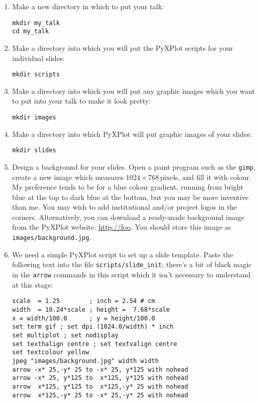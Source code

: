 \begin{enumerate}
\item Make a new directory in which to put your talk:
\begin{verbatim}
mkdir my_talk
cd my_talk
\end{verbatim}
\item Make a directory into which you will put the PyXPlot scripts for your
individual slides:
\begin{verbatim}
mkdir scripts
\end{verbatim}
\item Make a directory into which you will put any graphic images which you
want to put into your talk to make it look pretty:
\begin{verbatim}
mkdir images
\end{verbatim}
\item Make a directory into which PyXPlot will put graphic images of your
slides:
\begin{verbatim}
mkdir slides
\end{verbatim}
\item Design a background for your slides. Open a paint program such as the
{\tt gimp}, create a new image which measures $1024\times768$\,pixels, and fill
it with colour. My preference tends to be for a blue colour gradient, running
from bright blue at the top to dark blue at the bottom, but you may be more
inventive than me. You may wish to add institutional and/or project logos in
the corners. Alternatively, you can download a ready-made background image from
the PyXPlot website: \url{http://foo}. You should store this image as {\tt
images/background.jpg}.
\item We need a simple PyXPlot script to set up a slide template. Paste the
following text into the file {\tt scripts/slide\_init}; there's a bit of black
magic in the {\tt arrow} commands in this script which it isn't necessary to
understand at this stage:\label{stp:presentation_magic}
\begin{verbatim}
scale  = 1.25        ; inch = 2.54 # cm
width  = 10.24*scale ; height =  7.68*scale
x = width/100.0      ; y = height/100.0
set term gif ; set dpi (1024.0/width) * inch
set multiplot ; set nodisplay
set texthalign centre ; set textvalign centre
set textcolour yellow
jpeg "images/background.jpg" width width
arrow -x* 25,-y* 25 to -x* 25, y*125 with nohead
arrow -x* 25, y*125 to  x*125, y*125 with nohead
arrow  x*125, y*125 to  x*125,-y* 25 with nohead
arrow  x*125,-y* 25 to -x* 25,-y* 25 with nohead
\end{verbatim}

\end{enumerate}
